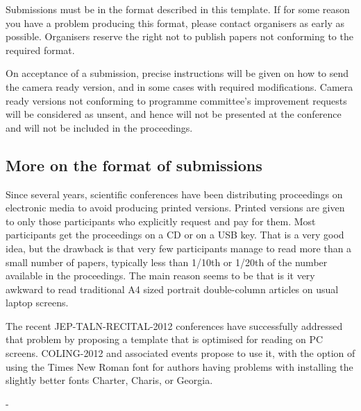 \documentclass[10pt,a5paper,twoside]{article}
\begin{document}
Submissions must be in the format described in this template. If for some reason you have a problem producing this format, please contact organisers as early as possible. Organisers reserve the right not to publish papers not conforming to the required format.

On acceptance of a submission, precise instructions will be given on how to send the camera ready version, and in some cases with required modifications. Camera ready versions not conforming to programme committee’s improvement requests will be considered as unsent, and hence will not be presented at the conference and will not be included in the proceedings.
\subsection{More on the format of submissions}
Since several years, scientific conferences have been distributing proceedings on electronic media to avoid producing printed versions. Printed versions are given to only those participants who explicitly request and pay for them. Most participants get the proceedings on a CD or on a USB key. That is a very good idea, but the drawback is that very few participants manage to read more than a small number of papers, typically less than 1/10th or 1/20th of the number available in the proceedings. The main reason seems to be that is it very awkward to read traditional A4 sized portrait double-column articles on usual laptop screens. 

The recent JEP-TALN-RECITAL-2012 conferences have successfully addressed that problem by proposing a template that is optimised for reading on PC screens. COLING-2012 and associated events propose to use it, with the option of using the Times New Roman font for authors having problems with installing the slightly better fonts Charter, Charis, or Georgia. 

-
\end{document}
